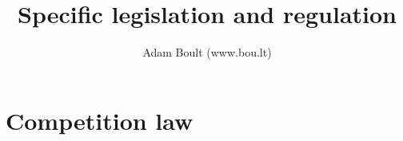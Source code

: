 \documentclass[oneside]{book}
\begin{document}
\author{Adam Boult (www.bou.lt)}
\title{Specific legislation and regulation}
\maketitle

\setcounter{tocdepth}{0}
\tableofcontents



\part{Competition law}



\end{document}
